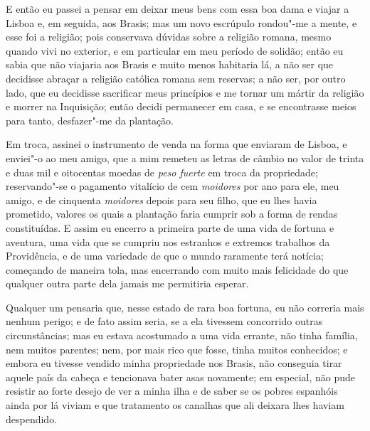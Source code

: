 E então eu passei a pensar em deixar meus bens com essa boa dama e
viajar a Lisboa e, em seguida, aos Brasis; mas um novo escrúpulo
rondou"-me a mente, e esse foi a religião; pois conservava dúvidas sobre
a religião romana, mesmo quando vivi no exterior, e em particular em meu
período de solidão; então eu sabia que não viajaria aos Brasis e muito
menos habitaria lá, a não ser que decidisse abraçar a religião católica
romana sem reservas; a não ser, por outro lado, que eu decidisse
sacrificar meus princípios e me tornar um mártir da religião e morrer na
Inquisição; então decidi permanecer em casa, e se encontrasse meios para
tanto, desfazer"-me da plantação.



Em troca, assinei o instrumento de venda na forma que enviaram de
Lisboa, e enviei"-o ao meu amigo, que a mim remeteu as letras de câmbio
no valor de trinta e duas mil e oitocentas moedas de \emph{peso fuerte}
em troca da propriedade; reservando"-se o pagamento vitalício de cem
\emph{moidores} por ano para ele, meu amigo, e de cinquenta
\emph{moidores} depois para seu filho, que eu lhes havia prometido,
valores os quais a plantação faria cumprir sob a forma de rendas
constituídas. E assim eu encerro a primeira parte de uma vida de fortuna
e aventura, uma vida que se cumpriu nos estranhos e extremos trabalhos
da Providência, e de uma variedade de que o mundo raramente terá
notícia; começando de maneira tola, mas encerrando com muito mais
felicidade do que qualquer outra parte dela jamais me permitiria
esperar.

Qualquer um pensaria que, nesse estado de rara boa fortuna, eu não
correria mais nenhum perigo; e de fato assim seria, se a ela tivessem
concorrido outras circunstâncias; mas eu estava acostumado a uma vida
errante, não tinha família, nem muitos parentes; nem, por mais rico que
fosse, tinha muitos conhecidos; e embora eu tivesse vendido minha
propriedade nos Brasis, não conseguia tirar aquele país da cabeça e
tencionava bater asas novamente; em especial, não pude resistir ao forte
desejo de ver a minha ilha e de saber se os pobres espanhóis ainda por
lá viviam e que tratamento os canalhas que ali deixara lhes haviam
despendido.

